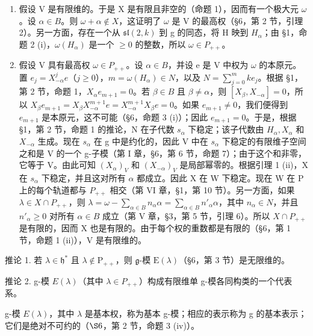 \begin{enumerate}
\def\labelenumi{\alph{enumi})}
\item
  假设 V 是有限维的。于是 X 是有限且非空的（命题 1），因而有一个极大元 \(\omega\)。设 \(\alpha \in B\)。则 \(\omega + \alpha \notin X\)，这证明了 \(\omega\) 是 V 的最高权（§6，第 2 节，引理 2）。另一方面，存在一个从 \(\mathfrak{sl}(2, k)\) 到 g 的同态，将 H 映到 \(H_{\alpha}\)；由 §1，命题 2 (i)，\(\omega(H_{\alpha})\) 是一个 \(\geq 0\) 的整数，所以 \(\omega \in P_{++}\)。
\item
  假设 V 具有最高权 \(\omega\in P_{++}\)。设 \(\alpha\in B\)，并设 e 是 V 中权为 \(\omega\) 的本原元。置 \(e_{j}=X_{-\alpha}^{j}e\)（\(j\geq0\)），\(m=\omega(H_{\alpha})\in N\)，以及 \(N=\sum_{j=0}^{m}ke_{j}\)。根据 §1，第 2 节，命题 1，\(X_{\alpha}e_{m+1}=0\)。若 \(\beta\in B\) 且 \(\beta\neq\alpha\)，则 \([X_{\beta},X_{-\alpha}]=0\)，所以 \(X_{\beta}e_{m+1}=X_{\beta}X_{-\alpha}^{m+1}e=X_{-\alpha}^{m+1}X_{\beta}e=0\)。如果 \(e_{m+1}\neq0\)，我们便得到 \(e_{m+1}\) 是本原元，这不可能（§6，命题 3 (i)）；因此 \(e_{m+1}=0\)。于是，根据 §1，第 2 节，命题 1 的推论，N 在子代数 \(s_{\alpha}\) 下稳定；该子代数由 \(H_{\alpha},X_{\alpha}\) 和 \(X_{-\alpha}\) 生成。现在 \(s_{\alpha}\) 在 g 中是约化的，因此 V 中在 \(s_{\alpha}\) 下稳定的有限维子空间之和是 V 的一个 g-子模（第 I 章，§6，第 6 节，命题 7）；由于这个和非零，它等于 V。由此可知 \((X_{\alpha})_{V}\) 和 \((X_{-\alpha})_{V}\) 是局部幂零的。根据引理 1 (ii)，X 在 \(s_{\alpha}\) 下稳定，并且这对所有 \(\alpha\) 都成立。因此 X 在 W 下稳定。现在 W 在 P 上的每个轨道都与 \(P_{++}\) 相交（第 VI 章，§1，第 10 节）。另一方面，如果 \(\lambda\in X\cap P_{++}\)，则 \(\lambda=\omega-\sum_{\alpha\in B}n_{\alpha}\alpha=\sum_{\alpha\in B}n'_{\alpha}\alpha\)，其中 \(n_{\alpha}\in N\)，并且 \(n'_{\alpha}\geq0\) 对所有 \(\alpha\in B\) 成立（第 V 章，§3，第 5 节，引理 6）。所以 \(X\cap P_{++}\) 是有限的，因而 X 也是有限的。由于每个权的重数都是有限的（§6，第 1 节，命题 1 (ii)），V 是有限维的。
\end{enumerate}

推论 1. 若 \(\lambda \in \mathfrak{h}^*\) 且 \(\lambda \notin \mathrm{P}_{++}\)，则 \(\mathfrak{g}\)-模 \(\mathrm{E}(\lambda)\)（§6，第 3 节）是无限维的。

推论 2. g-模 \(E(\lambda)\)（其中 \(\lambda \in P_{++}\)）构成有限维单 g-模各同构类的一个代表系。

g-模 \(E(\lambda)\)，其中 \(\lambda\) 是基本权，称为基本 g-模；相应的表示称为 g 的基本表示；它们是绝对不可约的（\(\S6\)，第 2 节，命题 3 (iv)）。

